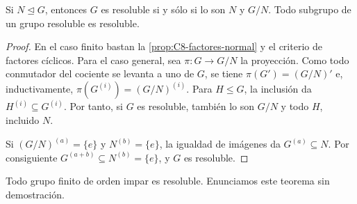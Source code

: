 \begin{coro}\label{coro:C8-extension-resoluble}
Si $N\trianglelefteq G$, entonces $G$ es resoluble si y sólo si lo son $N$ y $G/N$. Todo subgrupo de un grupo resoluble es resoluble.
\end{coro}
\begin{proof}
En el caso finito bastan la \cref{prop:C8-factores-normal} y el criterio de factores cíclicos. Para el caso general, sea $\pi:G\to G/N$ la proyección. Como todo conmutador del cociente se levanta a uno de $G$, se tiene $\pi(G')=(G/N)'$ e, inductivamente, $\pi(G^{(i)})=(G/N)^{(i)}$. Para $H\le G$, la inclusión da $H^{(i)}\subseteq G^{(i)}$. Por tanto, si $G$ es resoluble, también lo son $G/N$ y todo $H$, incluido $N$.

Si $(G/N)^{(a)}=\{e\}$ y $N^{(b)}=\{e\}$, la igualdad de imágenes da $G^{(a)}\subseteq N$. Por consiguiente $G^{(a+b)}\subseteq N^{(b)}=\{e\}$, y $G$ es resoluble.
\end{proof}
\begin{obs}
Todo grupo finito de orden impar es resoluble. Enunciamos este teorema sin demostración.
\end{obs}

